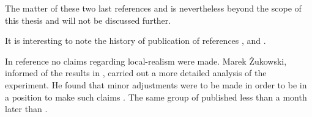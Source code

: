 The matter of these two last references \cite{PhysRevA.61.022109} and \cite{Nature.403.515} is nevertheless beyond the scope of this thesis and will not be discussed further.

\begin{note}
  It is interesting to note the history of publication of references \cite{PhysRevLett.82.1345}, \cite{PhysRevA.61.022109} and \cite{Nature.403.515}.

  In reference \cite{PhysRevLett.82.1345} no claims regarding local-realism were made. Marek \.{Z}ukowski, informed of the results in \cite{PhysRevLett.82.1345}, carried out a more detailed analysis of the experiment. He found that minor adjustments were to be made in order to be in a position to make such claims \cite{PhysRevA.61.022109}. The same group of \cite{PhysRevLett.82.1345} published \cite{Nature.403.515} less than a month later than \cite{PhysRevA.61.022109}.
\end{note}
